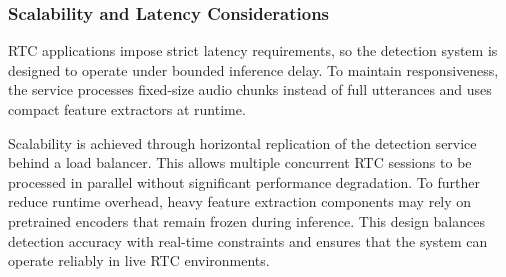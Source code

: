 \subsubsection{Scalability and Latency Considerations}

RTC applications impose strict latency requirements, so the detection system is designed to operate under bounded inference delay. To maintain responsiveness, the service processes fixed-size audio chunks instead of full utterances and uses compact feature extractors at runtime.

Scalability is achieved through horizontal replication of the detection service behind a load balancer. This allows multiple concurrent RTC sessions to be processed in parallel without significant performance degradation. To further reduce runtime overhead, heavy feature extraction components may rely on pretrained encoders that remain frozen during inference. This design balances detection accuracy with real-time constraints and ensures that the system can operate reliably in live RTC environments.